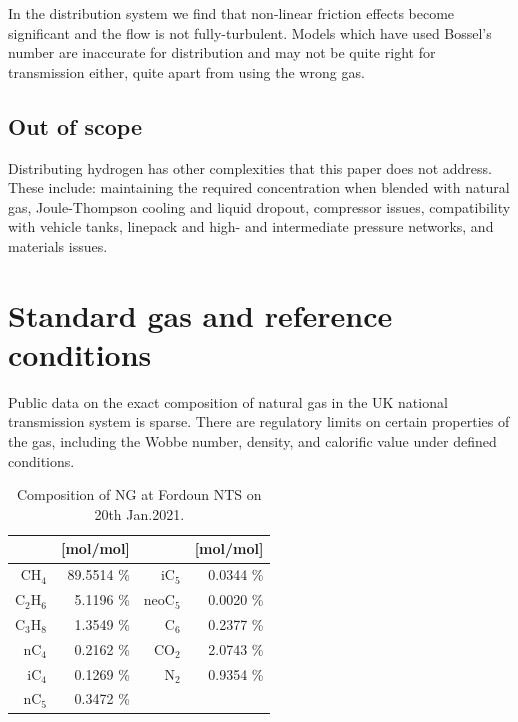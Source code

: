 \documentclass[5p]{elsarticle} %
\begin{document}
In the distribution system we find that non-linear friction effects become significant and the flow is not fully-turbulent. 
Models which have used Bossel's number are inaccurate for distribution and may not be quite right for transmission either, quite apart from using the wrong gas.

\subsection{Out of scope}

Distributing hydrogen has other complexities that this paper does not address. 
These include:
maintaining the required concentration when blended with natural gas\citep{H2Blends21}, 
Joule-Thompson cooling and liquid dropout\citep{Schouten2004}, 
compressor issues\citep{Wit2018}, 
compatibility with vehicle tanks\citep{Altfeld2013}, 
linepack and high- and intermediate pressure networks\citep{Witek2022}, 
and
materials issues\citep{ARUP2023}.

\section{Standard gas and reference conditions}
\label{sec:standards}

Public data on the exact composition of natural gas in the UK national transmission system is sparse.
There are regulatory limits on certain properties of the gas, including the Wobbe number, density, and calorific value under defined conditions.

\begin{table}[htb]
    \centering
    \begin{tabular}{r|r|r|r}
        & [mol/mol]  && [mol/mol]\\
        \hline
        CH$_4$    & 89.5514  \% & iC$_5$    &  0.0344 \%\\
        C$_2$H$_6$   &  5.1196  \% & neoC$_5$  &  0.0020 \%\\
        C$_3$H$_8$   &  1.3549  \% & C$_6$     &  0.2377 \%\\
        nC$_4$    &  0.2162  \% & CO$_2$    &  2.0743 \%\\
        iC$_4$    &  0.1269  \% &N$_2$     &  0.9354 \%\\
        nC$_5$    &  0.3472  \% &   &  \\
         \hline
    \end{tabular}
    \caption{Composition of NG at Fordoun NTS on 20th Jan.2021.\citep{cngservices2019}}
    \label{tab:Fordoun}
\end{table}
\end{document}

